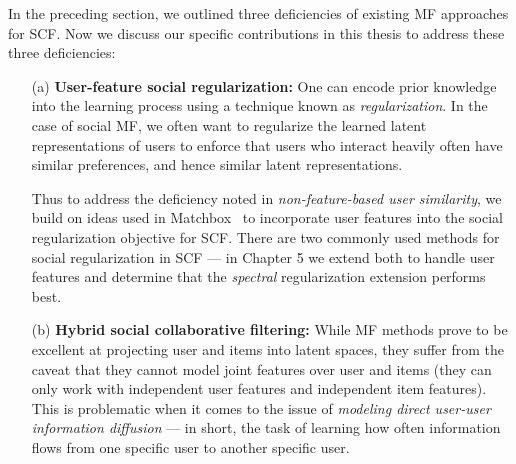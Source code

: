 In the preceding section, we outlined three deficiencies of existing MF
approaches for SCF.  Now we discuss our specific
contributions in this thesis to address these three deficiencies:
\begin{enumerate}
\item[(a)] {\bf User-feature social regularization:} One can encode
prior knowledge into the learning process using a technique known as
\emph{regularization}.  In the case of social MF, we often want to
regularize the learned latent representations of users to enforce that
users who interact heavily often have similar preferences, and hence
similar latent representations.  

Thus to address the deficiency noted in
\emph{non-feature-based user similarity}, we build on ideas used in
Matchbox~\cite{matchbox} to incorporate user features into the social
regularization objective for SCF.  There are two commonly used methods
for social regularization in SCF --- in Chapter 5 we
extend both to handle user features and determine that the
\emph{spectral} regularization extension performs best.
\item[(b)] {\bf Hybrid social collaborative filtering:} While MF
methods prove to be excellent at projecting user and items into latent
spaces, they suffer from the caveat that they cannot model joint
features over user and items (they can only work with independent user
features and independent item features).  This is problematic when it
comes to the issue of \emph{modeling direct user-user information
diffusion} --- in short, the task of learning how often information
flows from one specific user to another specific user.  


\end{enumerate}
